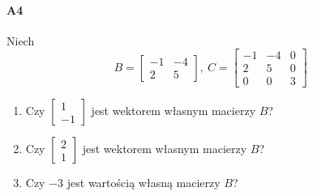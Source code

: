 \paragraph{A4}
Niech
$$B = \begin{bmatrix}
-1 & -4\\
 2 & 5
\end{bmatrix},\ C=\begin{bmatrix}
-1 & -4& 0\\
2&5&0\\
0&0&3
\end{bmatrix}$$
\begin{enumerate}[label=\alph*)]
\item Czy $\begin{bmatrix}
1\\-1
\end{bmatrix}$ jest wektorem własnym macierzy $B$?
\item Czy $\begin{bmatrix}
2\\1
\end{bmatrix}$ jest wektorem własnym macierzy $B$?
\item Czy $-3$ jest wartością własną macierzy $B$? 


\end{enumerate}
